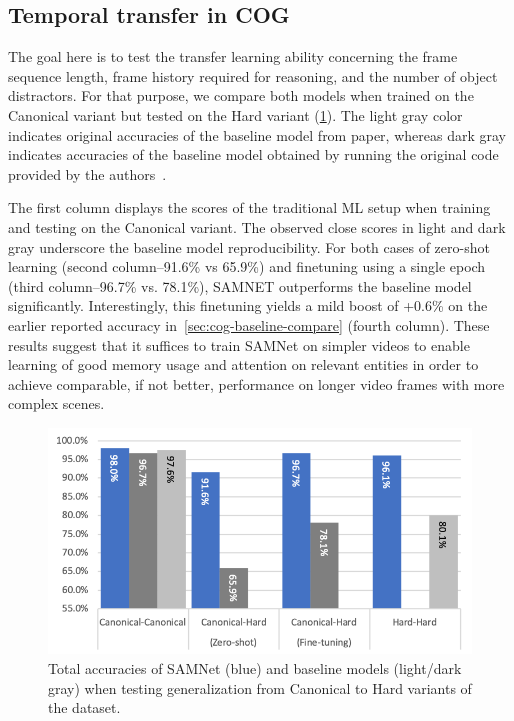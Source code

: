   

\subsection{Temporal transfer in COG}
\label{sec:temporal}

The goal here is to test the transfer learning ability concerning the frame sequence length, frame history required
for reasoning, and the number of object distractors.
For that purpose, we compare both models when trained on the Canonical variant but tested on the 
Hard variant (\cref{fig:samnet_cog_overall_transfer}).
The light gray color indicates original accuracies of the baseline model from paper, 
whereas dark gray indicates accuracies of the baseline model
obtained by running the original code provided by the authors~\cite{yang2018implement}.

The first column displays the scores of the traditional ML setup when training and testing on the Canonical variant. 
The observed close scores in light and dark gray underscore the baseline model reproducibility.
For both cases of zero-shot learning (second column--91.6\% vs 65.9\%) and finetuning using a single epoch 
(third column--96.7\% vs. 78.1\%), SAMNET outperforms the baseline model significantly.
Interestingly, this finetuning yields a mild boost of +0.6\% on the earlier reported accuracy 
in~\cref{sec:cog-baseline-compare} (fourth column).
These results suggest that it suffices to train SAMNet on simpler videos 
to enable learning of good memory usage and attention on relevant entities  
in order to achieve comparable, if not better, 
performance on longer video frames with more complex scenes.

\begin{figure}[htb]
	\centering
	\includegraphics[width=\columnwidth]{img/results/samnet_cog_overall_transfer.png}
	\caption{Total accuracies of SAMNet (blue) and baseline models (light/dark gray) when testing generalization from Canonical to Hard variants of the dataset.}
	\label{fig:samnet_cog_overall_transfer}
\end{figure}


